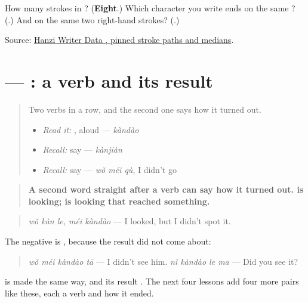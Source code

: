 \begin{tcolorbox}[breakable,colback=teal!4,colframe=teal!35!black,title={Before you move on}]
How many strokes in ? (\textbf{Eight}.) Which character you write ends on the same ? (\textbf{}.) And on the same two right-hand strokes? (\textbf{}.)

Source: \href{https://raw.githubusercontent.com/chanind/hanzi-writer-data/68d10a4b21150cae5e1ebbd223eed289cf32d90c/data/\%E5\%88\%B0.json}{Hanzi Writer Data , pinned stroke paths and medians}.
\end{tcolorbox}
\section[\texorpdfstring{\zh{看到} — \zh{没看到} (kàndào — méi kàndào)}{看到 — 没看到 (kàndào — méi kàndào)}]{ — : a verb and its result}

\label{lesson:ZH-C151-result}



\begin{quote}
Two verbs in a row, and the second one says how it turned out.

\begin{itemize}
\raggedright
  \item \emph{Read it:} , aloud — \emph{kàndào}
  \item \emph{Recall:} say  — \emph{kànjiàn}
  \item \emph{Recall:} say  — \emph{wǒ méi qù}, I didn't go
\end{itemize}
\end{quote}

\begin{grammarlens}[title={Grammar Lens: a verb, then what came of it}]
\begin{quote}
\textbf{A second word straight after a verb can say how it turned out.  is looking;  is looking that reached something.}
\end{quote}

\begin{quote}
\textbf{ } \emph{wǒ kàn le, méi kàndào} — I looked, but I didn't spot it.
\end{quote}

The negative is , because the result did not come about:

\begin{quote}
\textbf{} \emph{wǒ méi kàndào tā} — I didn't see him. \textbf{} \emph{nǐ kàndào le ma} — Did you see it?
\end{quote}

 is made the same way,  and its result . The next four lessons add four more pairs like these, each a verb and how it ended.
\end{grammarlens}

